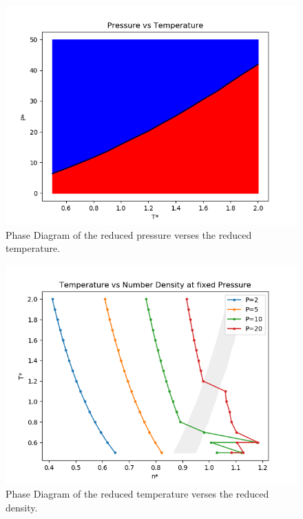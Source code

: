 \documentclass[letterpaper,twocolumn,amsmath,amssymb,prb]{revtex4-1}
\begin{document}
\begin{figure}
 \begin{center}
  \includegraphics[width=\columnwidth]{figs/Phase_Diagram_of_P_vs_T}
 \end{center}
\caption{Phase Diagram of the reduced pressure verses the reduced temperature.}
\label{fig:Phase_Diagram_P_vs_T}
\end{figure}

\begin{figure}
 \begin{center}
  \includegraphics[width=\columnwidth]{figs/T-vs-n_at_fixed_P}
 \end{center}
\caption{Phase Diagram of the reduced temperature verses the reduced density.}
\label{fig:T-vs-n_at_fixed_P}
\end{figure}
\end{document}
